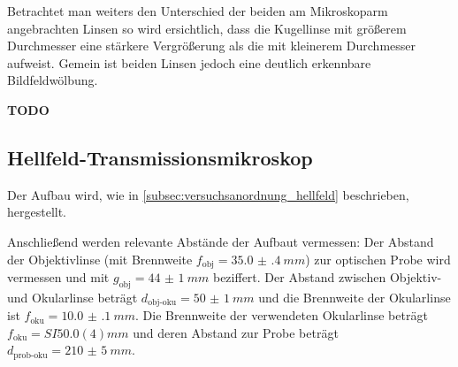 \documentclass[ngerman]{scrartcl}
\begin{document}
\setcaphanging
%
Betrachtet man weiters den Unterschied der beiden am Mikroskoparm angebrachten Linsen so wird ersichtlich, dass die Kugellinse mit größerem Durchmesser eine stärkere Vergrößerung als die mit kleinerem Durchmesser aufweist. Gemein ist beiden Linsen jedoch eine deutlich erkennbare Bildfeldwölbung.

\textbf{TODO}


\subsection{Hellfeld-Transmissionsmikroskop}
\label{subsec:durchfuehrung_hellfeld}

Der Aufbau wird, wie in \autoref{subsec:versuchsanordnung_hellfeld} beschrieben, hergestellt.

Anschließend werden relevante Abstände der Aufbaut vermessen: Der Abstand der Objektivlinse (mit Brennweite $f_{\text{obj}}=\SI{35.0(4)}{mm}$) zur optischen Probe wird vermessen und mit $g_{\text{obj}}=\SI{44(1)}{mm}$ beziffert. Der Abstand zwischen Objektiv- und Okularlinse beträgt $d_{\text{obj-oku}}=\SI{50(1)}{mm}$ und die Brennweite der Okularlinse ist $f_{\text{oku}}=\SI{10.0(1)}{mm}$. Die Brennweite der verwendeten Okularlinse beträgt $f_{\text{oku}}=SI{50.0(4)}{mm}$ und deren Abstand zur Probe beträgt $d_{\text{prob-oku}}=\SI{210(5)}{mm}$.
\end{document}
